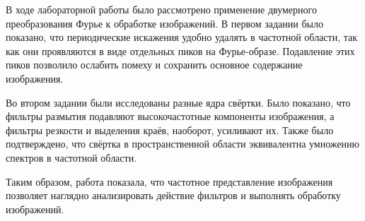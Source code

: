 \documentclass[a4paper, 12pt]{article}
\begin{document}
В ходе лабораторной работы было рассмотрено применение двумерного преобразования Фурье к обработке изображений. В первом задании было показано, что периодические искажения удобно удалять в частотной области, так как они проявляются в виде отдельных пиков на Фурье-образе. Подавление этих пиков позволило ослабить помеху и сохранить основное содержание изображения.

Во втором задании были исследованы разные ядра свёртки. Было показано, что фильтры размытия подавляют высокочастотные компоненты изображения, а фильтры резкости и выделения краёв, наоборот, усиливают их. Также было подтверждено, что свёртка в пространственной области эквивалентна умножению спектров в частотной области.

Таким образом, работа показала, что частотное представление изображения позволяет наглядно анализировать действие фильтров и выполнять обработку изображений.
\end{document}
